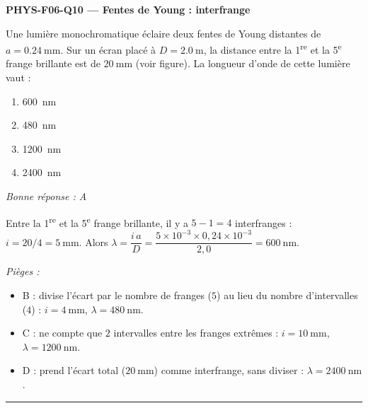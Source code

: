 \documentclass[11pt,a4paper]{article}
\begin{document}
\noindent\textbf{PHYS-F06-Q10 --- Fentes de Young : interfrange}\par
Une lumière monochromatique éclaire deux fentes de Young distantes de $a = \qty{0.24}{\milli\metre}$. Sur un écran placé à $D = \qty{2.0}{\metre}$, la distance entre la 1\textsuperscript{re} et la 5\textsuperscript{e} frange brillante est de $\qty{20}{\milli\metre}$ (voir figure). La longueur d'onde de cette lumière vaut :
\begin{center}
\end{center}
\begin{enumerate}[label=\Alph*)]
\item \qty{600}{\nano\metre}
\item \qty{480}{\nano\metre}
\item \qty{1200}{\nano\metre}
\item \qty{2400}{\nano\metre}
\end{enumerate}
\textit{Bonne réponse : A}\par
Entre la 1\textsuperscript{re} et la 5\textsuperscript{e} frange brillante, il y a $5-1 = 4$ interfranges : $i = 20/4 = \qty{5}{\milli\metre}$. Alors $\lambda = \dfrac{i\,a}{D} = \dfrac{5\times10^{-3}\times0{,}24\times10^{-3}}{2{,}0} = \qty{600}{\nano\metre}$.\par
\textit{Pièges :}
\begin{itemize}
\item B : divise l'écart par le nombre de franges ($5$) au lieu du nombre d'intervalles ($4$) : $i = \qty{4}{\milli\metre}$, $\lambda = \qty{480}{\nano\metre}$.
\item C : ne compte que $2$ intervalles entre les franges extrêmes : $i = \qty{10}{\milli\metre}$, $\lambda = \qty{1200}{\nano\metre}$.
\item D : prend l'écart total ($\qty{20}{\milli\metre}$) comme interfrange, sans diviser : $\lambda = \qty{2400}{\nano\metre}$.
\end{itemize}
\vspace{8pt}\hrule\vspace{8pt}
\end{document}
